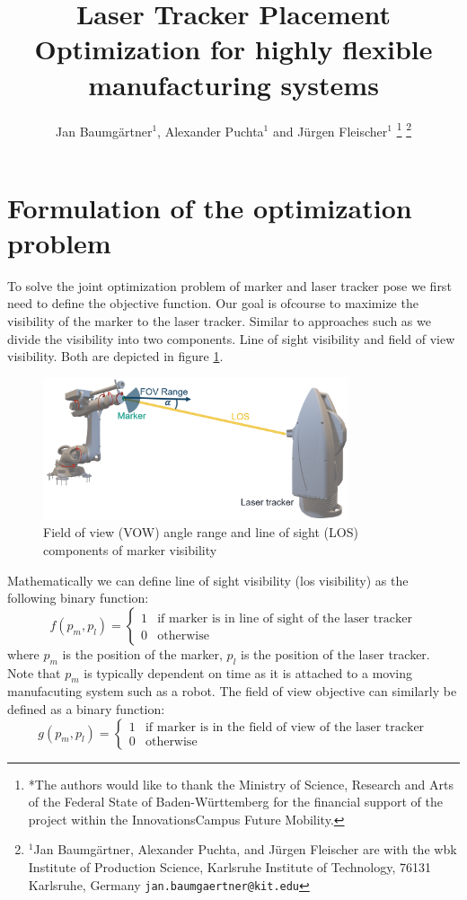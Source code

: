 \documentclass{svproc}
\title{\LARGE \bf
Laser Tracker Placement Optimization for highly flexible manufacturing systems
}
\author{Jan Baumgärtner$^{1}$,  Alexander Puchta$^{1}$ and Jürgen Fleischer$^{1}$%
\thanks{*The authors would like to thank the Ministry of Science, Research and Arts of the Federal State of Baden-Württemberg for the financial support of the project within the InnovationsCampus Future Mobility.
}%
\thanks{$^{1}$Jan Baumgärtner, Alexander Puchta, and Jürgen Fleischer are with the wbk Institute of Production Science,
        Karlsruhe Institute of Technology, 76131 Karlsruhe, Germany
        {\tt\small jan.baumgaertner@kit.edu}}%
}
\begin{document}
\maketitle
\thispagestyle{empty}
\pagestyle{empty}


\section{Formulation of the optimization problem}
To solve the joint optimization problem of marker and laser tracker pose we first need to define the objective function.
Our goal is ofcourse to maximize the visibility of the marker to the laser tracker.
Similar to approaches such as \cite{ieee_sensors} we divide the visibility into two components.
Line of sight visibility and field of view visibility.
Both  are depicted in figure \ref{fig:visibility}.
\begin{figure}
        \centering
        \includegraphics[width=0.8\textwidth]{figures/visibility.png}
        \caption{Field of view (VOW) angle range and line of sight (LOS) components of marker visibility}
        \label{fig:visibility}
\end{figure}
Mathematically we can define line of sight visibility (los visibility) as the following binary function:
\begin{equation}
    f(p_m,p_l) = \begin{cases}
    1 & \text{if } \text{marker is in line of sight of the laser tracker} \\
    0 & \text{otherwise}
    \end{cases}
\end{equation}
where $p_m$ is the position of the marker, $p_l$ is the position of the laser tracker.
Note that $p_m$ is typically dependent on time as it is attached to a moving manufacuting system such as a robot.
The field of view objective can similarly be defined as a binary function:
\begin{equation}
    g(p_m,p_l) = \begin{cases}
    1 & \text{if } \text{marker is in the field of view of the laser tracker} \\
    0 & \text{otherwise}
    \end{cases}
\end{equation}
\end{document}
